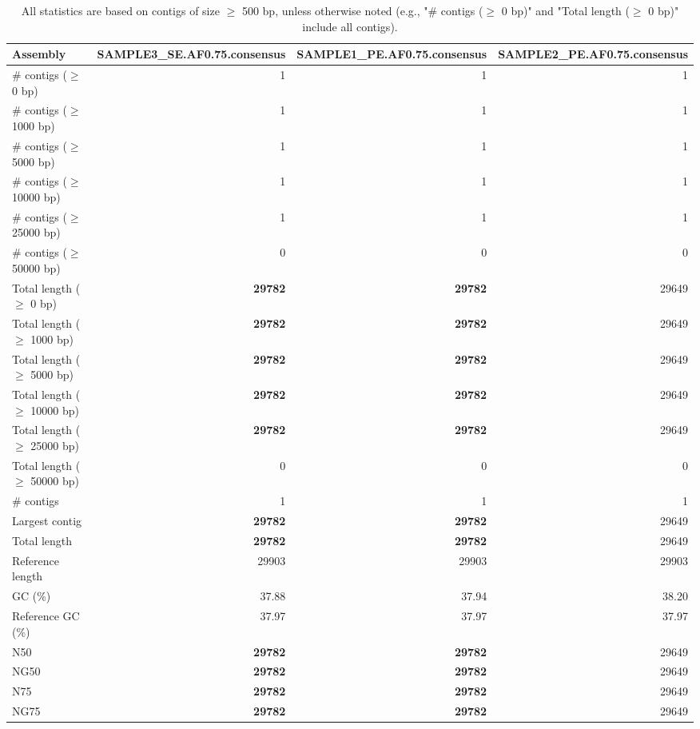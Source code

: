 \documentclass[12pt,a4paper]{article}
\begin{document}
\begin{table}[ht]
\begin{center}
\caption{All statistics are based on contigs of size $\geq$ 500 bp, unless otherwise noted (e.g., "\# contigs ($\geq$ 0 bp)" and "Total length ($\geq$ 0 bp)" include all contigs).}
\begin{tabular}{|l*{3}{|r}|}
\hline
Assembly & SAMPLE3\_SE.AF0.75.consensus & SAMPLE1\_PE.AF0.75.consensus & SAMPLE2\_PE.AF0.75.consensus \\ \hline
\# contigs ($\geq$ 0 bp) & 1 & 1 & 1 \\ \hline
\# contigs ($\geq$ 1000 bp) & 1 & 1 & 1 \\ \hline
\# contigs ($\geq$ 5000 bp) & 1 & 1 & 1 \\ \hline
\# contigs ($\geq$ 10000 bp) & 1 & 1 & 1 \\ \hline
\# contigs ($\geq$ 25000 bp) & 1 & 1 & 1 \\ \hline
\# contigs ($\geq$ 50000 bp) & 0 & 0 & 0 \\ \hline
Total length ($\geq$ 0 bp) & {\bf 29782} & {\bf 29782} & 29649 \\ \hline
Total length ($\geq$ 1000 bp) & {\bf 29782} & {\bf 29782} & 29649 \\ \hline
Total length ($\geq$ 5000 bp) & {\bf 29782} & {\bf 29782} & 29649 \\ \hline
Total length ($\geq$ 10000 bp) & {\bf 29782} & {\bf 29782} & 29649 \\ \hline
Total length ($\geq$ 25000 bp) & {\bf 29782} & {\bf 29782} & 29649 \\ \hline
Total length ($\geq$ 50000 bp) & 0 & 0 & 0 \\ \hline
\# contigs & 1 & 1 & 1 \\ \hline
Largest contig & {\bf 29782} & {\bf 29782} & 29649 \\ \hline
Total length & {\bf 29782} & {\bf 29782} & 29649 \\ \hline
Reference length & 29903 & 29903 & 29903 \\ \hline
GC (\%) & 37.88 & 37.94 & 38.20 \\ \hline
Reference GC (\%) & 37.97 & 37.97 & 37.97 \\ \hline
N50 & {\bf 29782} & {\bf 29782} & 29649 \\ \hline
NG50 & {\bf 29782} & {\bf 29782} & 29649 \\ \hline
N75 & {\bf 29782} & {\bf 29782} & 29649 \\ \hline
NG75 & {\bf 29782} & {\bf 29782} & 29649 \\ \hline

\end{tabular}
\end{center}
\end{table}
\end{document}
